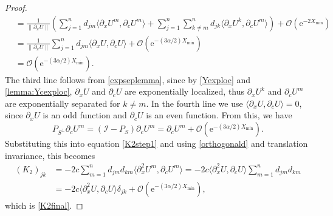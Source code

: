 \documentclass[review,onefignum,onetabnum]{siamart171218}
\newcommand{\rme}{\mathrm{e}}
\newcommand{\calI}{\mathcal{I}}
\newcommand{\vK}{\bm{\mathit{K}}}
\begin{document}
\begin{proof}
\[\begin{aligned}
&= \frac{1}{\|\partial_x U\|} \left( \sum_{j=1}^n d_{jm} \langle \partial_x U^m, \partial_c U^m \rangle + \sum_{j=1}^n \sum_{k \neq m}^n d_{jk} \langle \partial_x U^k, \partial_c U^m \rangle \right) + \mathcal{O}(\rme^{-2 X_{\mathrm{min}}}) \\
&= \frac{1}{\|\partial_x U\|} \sum_{j=1}^n d_{jm} \langle \partial_x U, \partial_c U \rangle + \mathcal{O}(\rme^{-(3 \alpha/2) X_{\mathrm{min}}}) \\
&= \mathcal{O}(\rme^{-(3 \alpha/2) X_{\mathrm{min}}}).
\end{aligned}
\]
The third line follows from \cref{expseplemma}, since by \cref{Yexploc} and \cref{lemma:Ycexploc}, $\partial_x U$ and $\partial_c U$ are exponentially localized, thus $\partial_x U^k$ and $\partial_c U^m$ are exponentially separated for $k \neq m$.
In the fourth line we use $\langle \partial_x U, \partial_c U \rangle = 0$, since $\partial_x U$ is an odd function and $\partial_c U$ is an even function. From this, we have
\[
P_{S^\perp} \partial_c U^m = (\calI - P_S) \partial_c U^m = \partial_c U^m + \mathcal{O}(\rme^{-(3 \alpha/2) X_{\mathrm{min}}}).
\]
Substituting this into equation \cref{K2step1} and using \cref{orthogonald} and translation invariance, this becomes
\[
\begin{aligned}
(\vK_2)_{jk}
&= -2 c \sum_{m = 1}^{n} d_{jm} d_{km} \langle \partial_x^2U^m, \partial_cU^m \rangle
= -2 c \langle \partial_x^2U, \partial_cU \rangle \sum_{m = 1}^{n} d_{jm} d_{km} \\
&= -2 c \langle \partial_x^2U,\partial_cU \rangle \delta_{jk} + \mathcal{O}(\rme^{-(3 \alpha/2) X_{\mathrm{min}}}),
\end{aligned}
\]
which is \cref{K2final}.
\end{proof}
\end{document}
